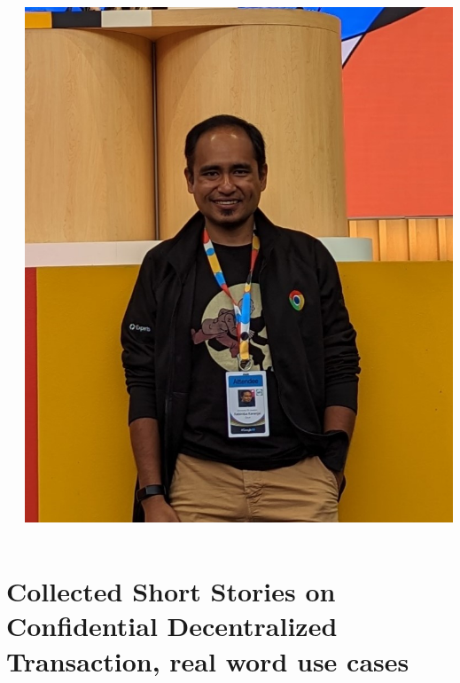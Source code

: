 \documentclass[10pt,aspectratio=169]{beamer}
\begin{document}
\begin{frame}
\begin{columns}
\begin{column}{0.7\textwidth}
\end{column}
\begin{column}{0.3\textwidth}
\includegraphics[width=\textwidth]{source/me}\\
\end{column}
\end{columns}
\end{frame}



\section{Collected Short Stories on Confidential Decentralized Transaction, real word use cases}
\end{document}
